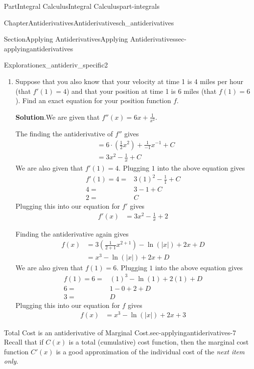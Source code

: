 \documentclass{tufte-book}
\newcommand{\blocktitlefont}{\relax}
\numberwithin{equation}{chapter}
\newcommand{\amp}{&}
\begin{document}
\begin{partptx}{Part}{Integral Calculus}{}{Integral Calculus}{}{}{part-integrals}
\begin{chapterptx}{Chapter}{Antiderivatives}{}{Antiderivatives}{}{}{ch_antiderivatives}
\begin{sectionptx}{Section}{Applying Antiderivatives}{}{Applying Antiderivatives}{}{}{sec-applyingantiderivatives}
\begin{exploration}{Exploration}{}{ex_antideriv_specific2}
\begin{enumerate}[font=\bfseries,label=(\alph*),ref=\alph*]
\begin{equation*}
\end{equation*}
for some unknown constants \(C,D\)%
\item{}Suppose that you also know that your velocity at time 1 is 4 miles per hour (that \(f'(1)=4\)) and that your position at time 1 is 6 miles (that \(f(1)=6\)). Find an exact equation for your position function \(f\).%
\par\smallskip%
\noindent\textbf{\blocktitlefont Solution}.\hypertarget{ex_antideriv_specific2-3-2}{}\quad{}We are given that  \(f''(x) = 6x + \frac{1}{x^2}\).%
\par
The finding the  antiderivative of \(f''\) gives%
\begin{align*}
\amp = 6\cdot(\frac{1}{2} x^2) + \frac{1}{-1}x^{-1} + C\\
\amp = 3 x^2  - \frac{1}{x} + C 
\end{align*}
We are also given that \(f'(1)=4\).  Plugging \(1\) into the above equation gives%
\begin{align*}
f'(1)= 4 = \amp 3(1)^2 - \frac{1}{1} + C\\
4 = \amp 3 - 1 + C\\
2 = \amp C
\end{align*}
Plugging this into our equation for \(f'\) gives%
\begin{align*}
f'(x) \amp = 3 x^2  - \frac{1}{x} + 2 
\end{align*}
%
\par
Finding the antiderivative again gives%
\begin{align*}
f(x) \amp = 3(\frac{1}{2+1}x^{2+1}) - \ln(|x|) + 2x + D\\
\amp = x^3 - \ln(|x|) + 2x + D
\end{align*}
We are also given that \(f(1) = 6\).  Plugging \(1\) into the above equation gives%
\begin{align*}
f(1)=6= \amp  (1)^3 - \ln(1) + 2(1) + D \\
6 = \amp 1-0+2+D \\
3 = \amp D
\end{align*}
Plugging this into our equation for \(f\) gives%
\begin{align*}
f(x)  \amp = x^3 - \ln(|x|) + 2x + 3
\end{align*}
%
\end{enumerate}%
\end{exploration}%
\begin{paragraphs}{Total Cost is an antiderivative of Marginal Cost.}{sec-applyingantiderivatives-7}%
Recall that if \(C(x)\) is a total (cumulative) cost function, then the marginal cost function \(C'(x)\) is a good approximation of the individual cost of the \emph{next item only}.%

\end{paragraphs}
\end{sectionptx}
\end{chapterptx}
\end{partptx}
\end{document}
